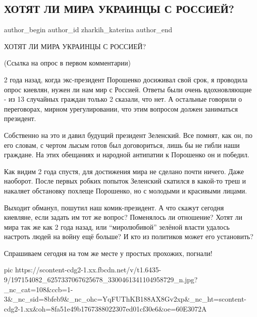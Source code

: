  
 
 
 
 
 
\subsection{ХОТЯТ ЛИ МИРА УКРАИНЦЫ С РОССИЕЙ?}
\label{sec:07_06_2021.fb.zharkih_katerina.1.ukraina_rossia_mir}
\ifcmt
 author_begin
   author_id zharkih_katerina
 author_end
\fi

ХОТЯТ ЛИ МИРА УКРАИНЦЫ С РОССИЕЙ?

(Ссылка на опрос в первом комментарии)

2 года назад, когда экс-президент Порошенко досиживал свой срок, я проводила
опрос киевлян, нужен ли нам мир с Россией. Ответы были очень вдохновляющие - из
13 случайных граждан только 2 сказали, что нет. А остальные говорили о
переговорах, мирном урегулировании, что этим вопросом должен заниматься
президент. 

Собственно на это и давил будущий президент Зеленский. Все помнят, как он, по
его словам, с чертом лысым готов был договориться, лишь бы не гибли наши
граждане. На этих обещаниях и народной антипатии к Порошенко он и победил. 

Как видим 2 года спустя, для достижения мира не сделано почти ничего. Даже
наоборот. После первых робких попыток Зеленский скатился в какой-то треш и
накаляет обстановку похлеще Порошенко, но с молодыми и красивыми лицами. 

Выходит обманул, пошутил наш комик-президент. А что скажут сегодня киевляне,
если задать им тот же вопрос? Поменялось ли отношение? Хотят ли мира так же как
2 года назад, или \enquote{миролюбивой} зелёной власти удалось настроть людей
на войну ещё больше? И кто из политиков может его установить? 

Спрашиваем сегодня на том же месте у простых прохожих, погнали!

\ifcmt
  pic https://scontent-cdg2-1.xx.fbcdn.net/v/t1.6435-9/197154082_6257337067625678_3300461341104958729_n.jpg?_nc_cat=108&ccb=1-3&_nc_sid=8bfeb9&_nc_ohc=YqFUThKB188AX8Gv2xp&_nc_ht=scontent-cdg2-1.xx&oh=8fa51e49b1767388022307ed01cf30e6&oe=60E3072A
\fi

